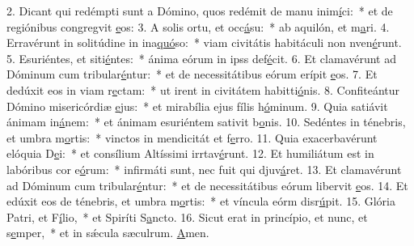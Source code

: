 2. Dicant qui redémpti sunt a Dómino, quos redémit de manu inim\uline{í}ci:~* et de regiónibus congregvit \uline{e}os:
3. A solis ortu, et occ\uline{á}su:~* ab aquilón, et m\uline{a}ri.
4. Erravérunt in solitúdine in ina\uline{quó}so:~* viam civitátis habitáculi non nven\uline{é}runt.
5. Esuriéntes, et siti\uline{é}ntes:~* ánima eórum in ipss def\uline{é}cit.
6. Et clamavérunt ad Dóminum cum tribular\uline{é}ntur:~* et de necessitátibus eórum erípit \uline{e}os.
7. Et dedúxit eos in viam r\uline{e}ctam:~* ut irent in civitátem habitti\uline{ó}nis.
8. Confiteántur Dómino misericórdiæ \uline{e}jus:~* et mirabília ejus fílis h\uline{ó}minum.
9. Quia satiávit ánimam in\uline{á}nem:~* et ánimam esuriéntem sativit b\uline{o}nis.
10. Sedéntes in ténebris, et umbra m\uline{o}rtis:~* vinctos in mendicitát et f\uline{e}rro.
11. Quia exacerbavérunt elóquia D\uline{e}i:~* et consílium Altíssimi irrtav\uline{é}runt.
12. Et humiliátum est in labóribus cor e\uline{ó}rum:~* infirmáti sunt, nec fuit qui djuv\uline{á}ret.
13. Et clamavérunt ad Dóminum cum tribular\uline{é}ntur:~* et de necessitátibus eórum libervit \uline{e}os.
14. Et edúxit eos de ténebris, et umbra m\uline{o}rtis:~* et víncula eórm disr\uline{ú}pit.
15. Glória Patri, et F\uline{í}lio,~* et Spiríti S\uline{a}ncto.
16. Sicut erat in princípio, et nunc, et s\uline{e}mper,~* et in sǽcula sæculrum. \uline{A}men.
